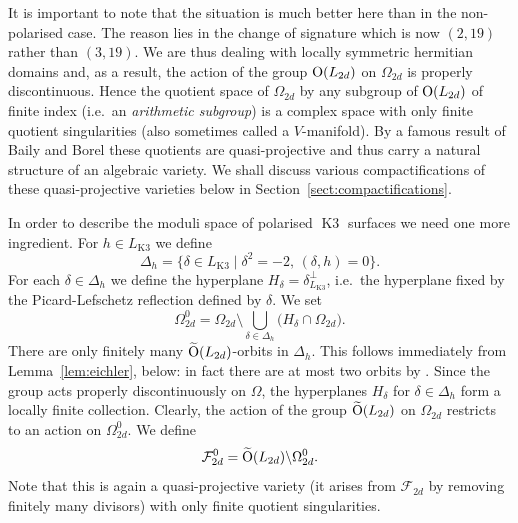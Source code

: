 \documentclass[a4paper,11pt]{article}
\newcommand{\cF}{\mathcal F}
\renewcommand{\Tilde}{\widetilde}
\newcommand{\Orth}{\mathop{\null\mathrm {O}}\nolimits}
\newcommand{\Kthree}{\mathop{\mathrm {K3}}\nolimits}
\begin{document}
It is important to note that the situation is much better here than in
the non-polarised case.  The reason lies in the change of signature
which is now $(2,19)$ rather than $(3,19)$. We are thus dealing with
locally symmetric hermitian domains and, as a result, the action of
the group $\Orth(L_{2d})$ on $\Omega_{2d}$ is properly
discontinuous. Hence the quotient space of $\Omega_{2d}$ by any
subgroup of $\Orth(L_{2d})$ of finite index (i.e.\ an \emph{arithmetic
  subgroup}) is a complex space with only finite quotient
singularities (also sometimes called a $V$-manifold). By a famous
result of Baily and Borel \cite{BB} these quotients are
quasi-projective and thus carry a natural structure of an algebraic
variety. We shall discuss various compactifications of these
quasi-projective varieties below in Section~\ref{sect:compactifications}.

In order to describe the moduli space of polarised $\Kthree$ surfaces
we need one more ingredient.  For $h\in L_{\Kthree}$ we define
\begin{equation*}
\Delta_h= \{ \delta\in L_{\Kthree} \mid \delta^2=-2, \,  (\delta,h)=0 \}.
\end{equation*}
For each $\delta \in \Delta_h$ we define the hyperplane
$H_\delta=\delta^{\perp}_{L_{\Kthree}}$, i.e.\ the hyperplane fixed by the
Picard-Lefschetz reflection defined by $\delta$. We set
\begin{equation*}
\Omega_{2d}^0 = \Omega_{2d} \setminus \bigcup_{\delta \in \Delta_h}
\big(H_\delta \cap \Omega_{2d}\big).
\end{equation*}
There are only finitely many $\Tilde{\Orth}(L_{2d})$-orbits in
$\Delta_h$. This follows immediately from Lemma~\ref{lem:eichler},
below: in fact there are at most two orbits by \cite[Proposition
  2.4(ii)]{GHSprop}.  Since the group acts properly discontinuously on
$\Omega$, the hyperplanes $H_\delta$ for $\delta\in \Delta_h$ form a
locally finite collection.  Clearly, the action of the group
$\Tilde{\Orth}(L_{2d})$ on $\Omega_{2d}$ restricts to an action on
$\Omega_{2d}^0$.  We define
\begin{equation*}
\cF_{2d}^0 = \Tilde{\Orth}(L_{2d}) \backslash \Omega_{2d}^0.
\end{equation*}
Note that this is again a quasi-projective variety (it arises from
$\cF_{2d}$ by removing finitely many divisors) with only finite
quotient singularities.
\end{document}
